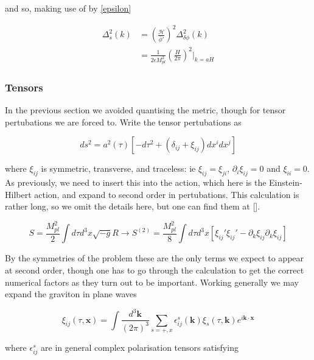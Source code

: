 \documentclass[a4paper,10pt]{article}
\renewcommand{\v}[1]{\mathbf{#1}}
\newcommand{\Mp}{M_{pl}}
\newcommand{\bphi}{\bar{\phi}}
\newcommand{\fint}[1]{\int \frac{d^3 \v{#1}}{(2\pi)^3}}
\begin{document}
and so, making use of by \ref{epsilon}

\begin{equation}\begin{split}
\Delta^2_s(k) &=(\frac{\mathcal{H}}{\bphi'})^2\Delta^2_{\delta\phi}(k)\\
&=\frac{1}{2\epsilon\Mp^2}(\frac{H}{2\pi})^2\rvert_{k=aH}
\end{split}\end{equation}


\subsubsection{Tensors}

In the previous section we avoided quantising the metric, though for tensor pertubations we are forced to. Write the tensor pertubations as 

\begin{equation}
ds^2 = a^2(\tau)[-d\tau^2 + (\delta_{ij}+\xi_{ij})dx^idx^j]
\end{equation}

where $\xi_{ij}$ is symmetric, transverse, and traceless: ie $\xi_{ij}=\xi_{ji}$, $\partial_i\xi_{ij}=0$ and $\xi_{ii}=0$.\\

As previously, we need to insert this into the action, which here is the Einstein-Hilbert action, and expand to second order in pertubations. This calculation is rather long, so we omit the details here, but one can find them at []. 

\begin{equation}
S=\frac{\Mp^2}{2} \int d\tau d^3x \sqrt{-g}R \rightarrow S^{(2)} = \frac{\Mp^2}{8}\int d\tau d^3x [\xi_{ij}'\xi_{ij}'-\partial_k\xi_{ij}\partial_k\xi_{ij}]
\end{equation}

By the symmetries of the problem these are the only terms we expect to appear at second order, though one has to go through the calculation to get the correct numerical factors as they turn out to be important. Working generally we may expand the graviton in plane waves 

\begin{equation}
\xi_{ij}(\tau, \v{x}) = \fint{k} \sum_{s=+,x} \epsilon_{ij}^s(\v{k})\xi_s(\tau,\v{k})e^{i\v{k}\cdot\v{x}}
\end{equation}

where $\epsilon_{ij}^s$ are in general complex polarisation tensors satisfying
\end{document}
